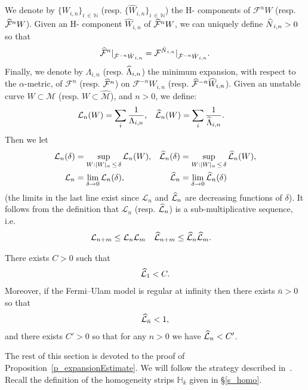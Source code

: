 \documentclass[AHL, Unicode, longabstracts,published]{cedram}
\newcommand{\bN}{\mathbb{N}}
\newcommand{\homo}{\mathbb{H}}
\newcommand{\cm}{\mathcal{F}}
\newcommand{\csp}{\mathcal{M}}
\newcommand{\cmp}{\hat\cm}
\newcommand{\cspi}{\widehat{\csp}}
\newcommand{\Hcomp}{H-\hskip0pt component}
\newcommand{\Hcomps}{H-\hskip0pt components}
\newcommand{\adm}{_{\alpha^{+}}}
\newcommand{\admName}{\alpha^{+}}
\newcommand{\Np}{\hat N}
\newcommand{\cL}{\mathcal{L}}
\renewcommand{\admName}{\alpha}
\renewcommand{\adm}{_{\alpha}}
\let\oldhat\hat
\renewcommand*{\hat}[1]{\mathchoice{\widehat{#1}}{\widehat{#1}}{\oldhat{#1}}{\oldhat{#1}}}
\begin{document}
We denote by $\{W_{i,n}\}_{i\,\in\,\bN}$ (resp. $\{\widehat W_{i,n}\}_{i\,\in\,\bN}$) the \Hcomps{} of $\cm^n W$ (resp. $\cmp^n W$). Given an \Hcomp{} $\widehat W_{i,n}$ of $\cmp^n W$, we can uniquely define $\Np_{i,n} > 0$ so that
\begin{align*}
\cmp^n|_{\cmp^{-n} \hat W_{i,n}} = \cm^{\Np_{i,n}}|_{\cmp^{-n} \hat W_{i,n}}.
\end{align*}
Finally, we denote by $\Lambda_{i,n}$ (resp. $\hat\Lambda_{i,n}$) the minimum expansion, with respect to the $\admName$-metric, of $\cm^n$ (resp. $\cmp^n$) on $\cm^{-n} W_{i,n}$ (resp. $\cmp^{-n}\widehat W_{i,n}$). Given an unstable curve $W\subset \csp$ (resp. $W\subset\cspi$), and $n > 0$, we define:
\begin{align*}
\cL_{n}(W) &= \sum_{i}\frac1{\Lambda_{i,n}},&
\hat \cL_{n}(W) &= \sum_{i}\frac1{\hat\Lambda_{i,n}}.
\end{align*}
Then we let
\begin{align*}
\cL_{n}(\delta) &= \sup_{W:|W|\adm\,\le\,\delta} \cL_{n}(W),&
\hat \cL_{n}(\delta) &= \sup_{W:|W|\adm\,\le\,\delta} \hat \cL_{n}(W),\\
\cL_{n} &= \lim_{\delta\to 0}\cL_{n}(\delta),&
\hat \cL_{n} &= \lim_{\delta\to 0} \hat \cL_{n}(\delta)
\end{align*}
(the limits in the last line exist since $\cL_n$ and $\hat\cL_n$ are decreasing functions of $\delta$). It follows from the definition that $\cL_{n}$ (resp. $\hat\cL_{n}$) is a sub-multiplicative sequence, i.e.
\begin{align}\label{eq:cL-submultiplicative}
\cL_{n+m}&\le\cL_{n}\cL_{m} & \hat\cL_{n+m}&\le\hat\cL_{n}\hat\cL_{m}.
\end{align}

\begin{prop}\label{p_expansionEstimate}
There exists $C > 0$ such that
\begin{align}\label{e_expansionEstimate-trivial}
\hat \cL_{1} < C.
\end{align}
Moreover, if the Fermi--Ulam model is regular at infinity then there exists $\bar n > 0$ so that
\begin{align}\label{e_expansionEstimate}
\hat \cL_{\bar n} < 1,
\end{align}
and there exists $C' > 0$ so that for any $n > 0$ we have $\hat \cL_{n} < C'$.
\end{prop}

The rest of this section is devoted to the proof of Proposition~\ref{p_expansionEstimate}. We will follow the strategy described in~\cite{jmogy}. Recall the definition of the homogeneity strips $\homo_k$ given in \S\ref{s_homo}.
\end{document}
